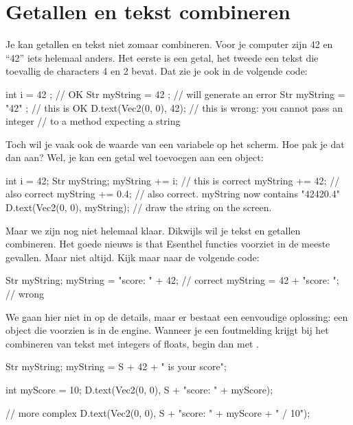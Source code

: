 \section{Getallen en tekst combineren}
Je kan getallen en tekst niet zomaar combineren. Voor je computer zijn 42 en ``42'' iets helemaal anders. Het eerste is een getal, het tweede een tekst die toevallig de characters 4 en 2 bevat. Dat zie je ook in de volgende code:

\begin{code}
int i        =  42    ; // OK
Str myString =  42    ; // will generate an error
Str myString = "42"   ; // this is OK
D.text(Vec2(0, 0), 42); // this is wrong: you cannot pass an integer 
                        // to a method expecting a string
\end{code}

Toch wil je vaak ook de waarde van een variabele op het scherm. Hoe pak je dat dan aan? Wel, je kan een getal wel toevoegen aan een  object:

\begin{code}
int i = 42;
Str myString;
myString +=   i; // this is correct
myString +=  42; // also correct
myString += 0.4; // also correct. myString now contains "42420.4"
D.text(Vec2(0, 0), myString); // draw the string on the screen.
\end{code}

Maar we zijn nog niet helemaal klaar. Dikwijls wil je tekst en getallen combineren. Het goede nieuws is that Esenthel functies voorziet in de meeste gevallen. Maar niet altijd. Kijk maar naar de volgende code:

\begin{code}
Str myString;
myString = "score: " + 42; // correct
myString = 42 + "score: "; // wrong
\end{code}

We gaan hier niet in op de details, maar er bestaat een eenvoudige oplossing: een  object  die voorzien is in de engine. Wanneer je een foutmelding krijgt bij het combineren van tekst met integers of floats, begin dan met . 

\begin{code}
Str myString;
myString = S + 42  + " is your score"; 

int myScore = 10;
D.text(Vec2(0, 0), S + "score: " + myScore);

// more complex
D.text(Vec2(0, 0), S + "score: " + myScore + " / 10");
\end{code}

